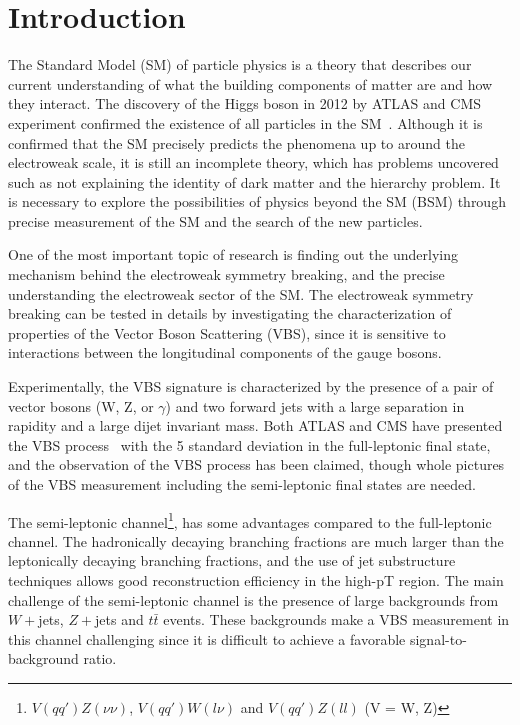 \chapter{Introduction}

The Standard Model (SM) of particle physics is a theory that describes our current understanding of what the building components of matter are and how they interact. The discovery of the Higgs boson in 2012 by ATLAS and CMS experiment confirmed the existence of all particles in the SM~\cite{HIGG-2012-27,CMS-HIG-12-028}. Although it is confirmed that the SM precisely predicts the phenomena up to around the electroweak scale, it is still an incomplete theory, which has problems uncovered such as not explaining the identity of dark matter and the hierarchy problem. It is necessary to explore the possibilities of physics beyond the SM (BSM) through precise measurement of the SM and the search of the new particles.

One of the most important topic of research is finding out the underlying mechanism behind the electroweak symmetry breaking, and the precise understanding the electroweak sector of the SM. The electroweak symmetry breaking can be tested in details by investigating the characterization of properties of the Vector Boson Scattering (VBS), since it is sensitive to interactions between the longitudinal components of the gauge bosons.

Experimentally, the VBS signature is characterized by the presence of a pair of vector bosons (W, Z, or $\gamma$) and two forward jets with a large separation in rapidity and a large dijet invariant mass.
Both ATLAS and CMS have presented the VBS process~\cite{STDM-2017-19,CMS-SMP-20-001}
with the 5 standard deviation in the full-leptonic final state,
and the 
observation of the VBS process has been claimed, though whole pictures of the VBS measurement including the semi-leptonic final states are needed.

The semi-leptonic channel\footnote{$V(qq')Z(\nu\nu)$, $V(qq')W(l\nu)$ and $V(qq')Z(ll)$ (V = W, Z)}, has some advantages compared to the full-leptonic channel. The hadronically decaying branching fractions are much larger than the leptonically decaying branching fractions, and the use of jet substructure techniques allows good reconstruction efficiency in the high-pT region. The main challenge of the semi-leptonic channel is the presence of large backgrounds from $W + $jets, $Z + $jets and $t\bar{t}$ events. These backgrounds make a VBS measurement in this channel challenging since it is difficult to achieve a favorable signal-to-background ratio. 

